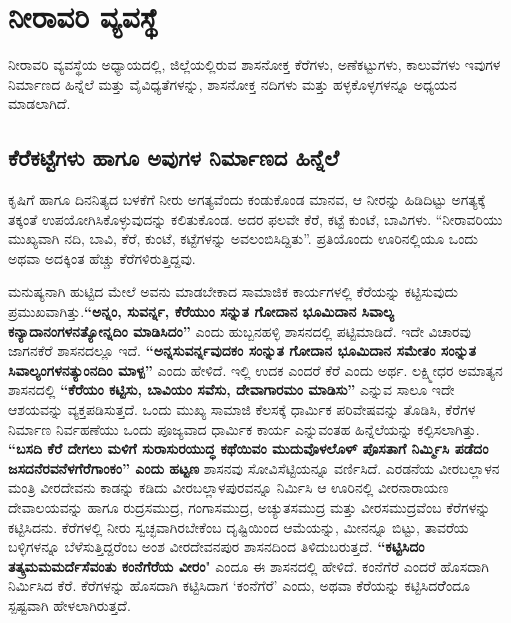 
\chapter{ನೀರಾವರಿ ವ್ಯವಸ್ಥೆ}

ನೀರಾವರಿ ವ್ಯವಸ್ಥೆಯ ಅಧ್ಯಾಯದಲ್ಲಿ, ಜಿಲ್ಲೆಯಲ್ಲಿರುವ ಶಾಸನೋಕ್ತ ಕೆರೆಗಳು, ಅಣೆಕಟ್ಟುಗಳು, ಕಾಲುವೆಗಳು ಇವುಗಳ ನಿರ್ಮಾಣದ ಹಿನ್ನೆಲೆ ಮತ್ತು ವೈವಿಧ್ಯತೆಗಳನ್ನು, ಶಾಸನೋಕ್ತ ನದಿಗಳು ಮತ್ತು ಹಳ್ಳಕೊಳ್ಳಗಳನ್ನೂ ಅಧ್ಯಯನ ಮಾಡಲಾಗಿದೆ.

\section{ಕೆರೆಕಟ್ಟೆಗಳು ಹಾಗೂ ಅವುಗಳ ನಿರ್ಮಾಣದ ಹಿನ್ನೆಲೆ}

ಕೃಷಿಗೆ ಹಾಗೂ ದಿನನಿತ್ಯದ ಬಳಕೆಗೆ ನೀರು ಅಗತ್ಯವೆಂದು ಕಂಡುಕೊಂಡ ಮಾನವ, ಆ ನೀರನ್ನು ಹಿಡಿದಿಟ್ಟು ಅಗತ್ಯಕ್ಕೆ ತಕ್ಕಂತೆ ಉಪಯೋಗಿಸಿಕೊಳ್ಳುವುದನ್ನು ಕಲಿತುಕೊಂಡ. ಅದರ ಫಲವೇ ಕೆರೆ, ಕಟ್ಟೆ ಕುಂಟೆ, ಬಾವಿಗಳು. “ನೀರಾವರಿಯು ಮುಖ್ಯವಾಗಿ ನದಿ, ಬಾವಿ, ಕೆರೆ, ಕುಂಟೆ, ಕಟ್ಟೆಗಳನ್ನು ಅವಲಂಬಿಸಿದ್ದಿತು”. ಪ್ರತಿಯೊಂದು ಊರಿನಲ್ಲಿಯೂ ಒಂದು ಅಥವಾ ಅದಕ್ಕಿಂತ ಹೆಚ್ಚು ಕೆರೆಗಳಿರುತ್ತಿದ್ದವು.

ಮನುಷ್ಯನಾಗಿ ಹುಟ್ಟಿದ ಮೇಲೆ ಅವನು ಮಾಡಬೇಕಾದ ಸಾಮಾಜಿಕ ಕಾರ್ಯಗಳಲ್ಲಿ ಕೆರೆಯನ್ನು ಕಟ್ಟಿಸುವುದು ಪ್ರಮುಖವಾಗಿತ್ತು.\textbf{“ಅನ್ನಂ, ಸುವರ್ನ್ನ, ಕೆರೆಯುಂ ಸನ್ನುತ ಗೋದಾನ ಭೂಮಿದಾನ ಸಿವಾಲ್ಯ ಕನ್ಯಾದಾನಂಗಳನತ್ಯೋನ್ನದಿಂ ಮಾಡಿಸಿದಂ” }ಎಂದು ಹುಬ್ಬನಹಳ್ಳಿ ಶಾಸನದಲ್ಲಿ ಪಟ್ಟಿಮಾಡಿದೆ. ಇದೇ ವಿಚಾರವು ಜಾಗನಕೆರೆ ಶಾಸನದಲ್ಲೂ ಇದೆ. \textbf{“ಅನ್ನಸುವರ್ನ್ನವುದಕಂ ಸಂನ್ನುತ ಗೋದಾನ ಭೂಮಿದಾನ ಸಮೇತಂ ಸಂನ್ನುತ ಸಿವಾಲ್ಯಂಗಳನತ್ಯುಂನದಿಂ ಮಾಳ್ಪ”} ಎಂದು ಹೇಳಿದೆ. ಇಲ್ಲಿ ಉದಕ ಎಂದರೆ ಕೆರೆ ಎಂದು ಅರ್ಥ. ಲಕ್ಷ್ಮೀಧರ ಅಮಾತ್ಯನ ಶಾಸನದಲ್ಲಿ \textbf{“ಕೆರೆಯಂ ಕಟ್ಟಿಸು, ಬಾವಿಯಂ ಸವೆಸು, ದೇವಾಗಾರಮಂ ಮಾಡಿಸು”} ಎನ್ನುವ ಸಾಲೂ ಇದೇ ಆಶಯವನ್ನು ವ್ಯಕ್ತಪಡಿಸುತ್ತದೆ. ಒಂದು ಮುಖ್ಯ ಸಾಮಾಜಿ ಕೆಲಸಕ್ಕೆ ಧಾರ್ಮಿಕ ಪರಿವೇಷವನ್ನು ತೊಡಿಸಿ, ಕೆರೆಗಳ ನಿರ್ಮಾಣ ನಿರ್ವಹಣೆಯು ಒಂದು ಪೂಜ್ಯವಾದ ಧಾರ್ಮಿಕ ಕಾರ್ಯ ಎನ್ನುವಂತಹ ಹಿನ್ನೆಲೆಯನ್ನು ಕಲ್ಪಿಸಲಾಗಿತ್ತು. \textbf{“ಬಸದಿ ಕೆರೆ ದೇಗಲು ಮಳಿಗೆ ಸುರಾಸುರಯುದ್ಧ ಕಥೆಯಿವಂ ಮುದುವೊಳಲೊಳ್​ ಪೊಸತಾಗೆ ನಿರ್ಮ್ಮಿಸಿ ಪಡೆದಂ ಜಸದನೆರವನೆಳಗೆರೆಗಾಂಕಂ” ಎಂದು ಹಟ್ಟಣ }ಶಾಸನವು ಸೋವಿಸೆಟ್ಟಿಯನ್ನೂ ವರ್ಣಿಸಿದೆ. ಎರಡನೆಯ ವೀರಬಲ್ಲಾಳನ ಮಂತ್ರಿ ವೀರದೇವನು ಕಾಡನ್ನು ಕಡಿದು ವೀರಬಲ್ಲಾಳಪುರವನ್ನೂ ನಿರ್ಮಿಸಿ ಆ ಊರಿನಲ್ಲಿ ವೀರನಾರಾಯಣ ದೇವಾಲಯವನ್ನು ಹಾಗೂ ರುದ್ರಸಮುದ್ರ, ಗಂಗಾಸಮುದ್ರ, ಅಚ್ಯುತಸಮುದ್ರ ಮತ್ತು ವೀರಸಮುದ್ರವೆಂಬ ಕೆರೆಗಳನ್ನು ಕಟ್ಟಿಸಿದನು. ಕೆರೆಗಳಲ್ಲಿ ನೀರು ಸ್ವಚ್ಛವಾಗಿರಬೇಕೆಂಬ ದೃಷ್ಟಿಯಿಂದ ಆಮೆಯನ್ನು, ಮೀನನ್ನೂ ಬಿಟ್ಟು, ತಾವರೆಯ ಬಳ್ಳಿಗಳನ್ನೂ ಬೆಳೆಸುತ್ತಿದ್ದರೆಂಬ ಅಂಶ ವೀರದೇವನಪುರ ಶಾಸನದಿಂದ ತಿಳಿದುಬರುತ್ತದೆ.\textbf{ “ಕಟ್ಟಿಸಿದಂ ತತ್ಕ್ರಮಮಮರ್ದೆಸೆವಂತು ಕಂನೆಗೆರೆಯ ವೀರಂ}" ಎಂದೂ ಈ ಶಾಸನದಲ್ಲಿ ಹೇಳಿದೆ. ಕಂನೆಗೆರೆ ಎಂದರೆ ಹೊಸದಾಗಿ ನಿರ್ಮಿಸಿದ ಕೆರೆ. ಕೆರೆಗಳನ್ನು ಹೊಸದಾಗಿ ಕಟ್ಟಿಸಿದಾಗ ‘ಕಂನೆಗೆರೆ’ ಎಂದು, ಅಥವಾ ಕೆರೆಯನ್ನು ಕಟ್ಟಿಸಿದರೆೆಂದೂ ಸ್ಪಷ್ಟವಾಗಿ ಹೇಳಲಾಗಿರುತ್ತದೆ.

